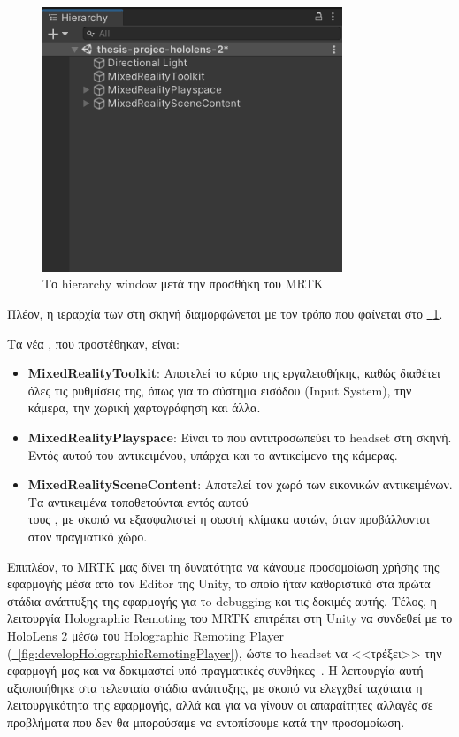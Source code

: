 \begin{figure}[!h]
    \centering
    \includegraphics[width=0.8\textwidth]{images/develop_hierarchyAfterMRTK.png}
    \caption{Το hierarchy window μετά την προσθήκη του MRTK}\label{fig:developHierarchyMRTK}
\end{figure}

Πλέον, η ιεραρχία των  στη σκηνή διαμορφώνεται με τον τρόπο που φαίνεται στο \hyperref[fig:developHierarchyMRTK]{\schema~\ref*{fig:developHierarchyMRTK}}.

Τα νέα , που προστέθηκαν, είναι:
\begin{itemize}
    \item \textbf{MixedRealityToolkit}: Αποτελεί το κύριο  της εργαλειοθήκης, καθώς διαθέτει όλες τις ρυθμίσεις της, όπως για το σύστημα εισόδου (Input System), την κάμερα, την χωρική χαρτογράφηση και άλλα.
    \item \textbf{MixedRealityPlayspace}: Είναι το  που αντιπροσωπεύει το headset στη σκηνή. Εντός αυτού του αντικειμένου, υπάρχει και το αντικείμενο της κάμερας.
    \item \textbf{MixedRealitySceneContent}: Αποτελεί τον χωρό των εικονικών αντικειμένων. Τα αντικειμένα τοποθετούνται εντός αυτού\\
    τους , με σκοπό να εξασφαλιστεί η σωστή κλίμακα αυτών, όταν προβάλλονται στον πραγματικό χώρο.
\end{itemize}

Επιπλέον, το MRTK μας δίνει τη δυνατότητα να κάνουμε προσομοίωση χρήσης της εφαρμογής μέσα από τον Editor της Unity, το οποίο ήταν καθοριστικό στα πρώτα στάδια ανάπτυξης της εφαρμογής για τo debugging και τις δοκιμές αυτής. Τέλος, η λειτουργία Holographic Remoting του MRTK επιτρέπει στη Unity να συνδεθεί με το HoloLens 2 μέσω του Holographic Remoting Player (\hyperref[fig:developHolographicRemotingPlayer]{\schema~\ref*{fig:developHolographicRemotingPlayer}}), ώστε το headset να <<τρέξει>> την εφαρμογή μας και να δοκιμαστεί υπό πραγματικές συνθήκες~\cite{florianbagarmicrosoft_2023_holographic}. Η λειτουργία αυτή αξιοποιήθηκε στα τελευταία στάδια ανάπτυξης, με σκοπό να ελεγχθεί ταχύτατα η λειτουργικότητα της εφαρμογής, αλλά και για να γίνουν οι απαραίτητες αλλαγές σε προβλήματα που δεν θα μπορούσαμε να εντοπίσουμε κατά την προσομοίωση.

